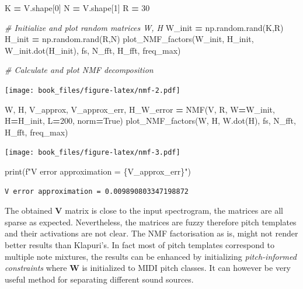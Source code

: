 \documentclass[american,]{article}
\newenvironment{Shaded}{\begin{snugshade}}{\end{snugshade}}
\newcommand{\BuiltInTok}[1]{#1}
\newcommand{\CommentTok}[1]{\textcolor[rgb]{0.56,0.35,0.01}{\textit{#1}}}
\newcommand{\DecValTok}[1]{\textcolor[rgb]{0.00,0.00,0.81}{#1}}
\newcommand{\NormalTok}[1]{#1}
\newcommand{\OperatorTok}[1]{\textcolor[rgb]{0.81,0.36,0.00}{\textbf{#1}}}
\newcommand{\SpecialCharTok}[1]{\textcolor[rgb]{0.00,0.00,0.00}{#1}}
\newcommand{\SpecialStringTok}[1]{\textcolor[rgb]{0.31,0.60,0.02}{#1}}
\newcommand{\VariableTok}[1]{\textcolor[rgb]{0.00,0.00,0.00}{#1}}
\begin{document}
\begin{Shaded}
\begin{Highlighting}[]
\NormalTok{K }\OperatorTok{=}\NormalTok{ V.shape[}\DecValTok{0}\NormalTok{]}
\NormalTok{N }\OperatorTok{=}\NormalTok{ V.shape[}\DecValTok{1}\NormalTok{]}
\NormalTok{R }\OperatorTok{=} \DecValTok{30}

\CommentTok{# Initialize and plot random matrices W, H}
\NormalTok{W_init }\OperatorTok{=}\NormalTok{ np.random.rand(K,R)}
\NormalTok{H_init }\OperatorTok{=}\NormalTok{ np.random.rand(R,N)}
\NormalTok{plot_NMF_factors(W_init, H_init, W_init.dot(H_init), fs, N_fft, H_fft, freq_max)}

\CommentTok{# Calculate and plot NMF decomposition}
\end{Highlighting}
\end{Shaded}

\texttt{[image: book\_files/figure-latex/nmf-2.pdf]}

\begin{Shaded}
\begin{Highlighting}[]
\NormalTok{W, H, V_approx, V_approx_err, H_W_error }\OperatorTok{=}\NormalTok{ NMF(V, R, W}\OperatorTok{=}\NormalTok{W_init, H}\OperatorTok{=}\NormalTok{H_init, L}\OperatorTok{=}\DecValTok{200}\NormalTok{, norm}\OperatorTok{=}\VariableTok{True}\NormalTok{)}
\NormalTok{plot_NMF_factors(W, H, W.dot(H), fs, N_fft, H_fft, freq_max)               }
\end{Highlighting}
\end{Shaded}

\texttt{[image: book\_files/figure-latex/nmf-3.pdf]}

\begin{Shaded}
\begin{Highlighting}[]
\BuiltInTok{print}\NormalTok{(}\SpecialStringTok{f"V error approximation = }\SpecialCharTok{\{}\NormalTok{V_approx_err}\SpecialCharTok{\}}\SpecialStringTok{"}\NormalTok{)}
\end{Highlighting}
\end{Shaded}

\begin{verbatim}
V error approximation = 0.009890803347198872
\end{verbatim}

The obtained \(\boldsymbol{V}\) matrix is close to the input spectrogram,
the matrices are all sparse as expected.
Nevertheless, the matrices are fuzzy therefore pitch templates
and their activations are not clear.
The NMF factorisation as is, might not render better results than Klapuri's.
In fact most of pitch templates correspond to multiple note mixtures,
the results can be enhanced by initializing \emph{pitch-informed constraints}
where \(\boldsymbol{W}\) is initialized to MIDI pitch classes.
It can however be very useful method for separating different sound sources.
\end{document}

